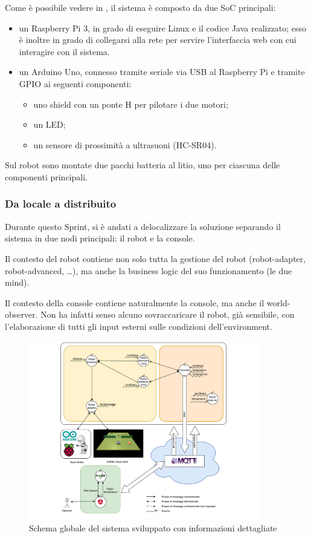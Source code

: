 Come è possibile vedere in , il sistema è composto da due SoC principali:

\begin{itemize}
  \item
    un Raspberry Pi 3, in grado di eseguire Linux e il codice Java realizzato;
    esso è inoltre in grado di collegarsi alla rete per servire l'interfaccia web con cui interagire con il sistema.
  \item
    un Arduino Uno, connesso tramite seriale via USB al Raspberry Pi e tramite GPIO ai seguenti componenti:
    \begin{itemize}
      \item uno shield con un ponte H per pilotare i due motori;
      \item un LED\@;
      \item un sensore di prossimità a ultrasuoni (HC-SR04).
    \end{itemize}
\end{itemize}

Sul robot sono montate due pacchi batteria al litio, uno per ciascuna delle componenti principali.

\subsubsection{Da locale a distribuito}

Durante questo Sprint, si è andati a delocalizzare la soluzione separando il sistema in due nodi principali:
il robot e la console.

Il contesto del robot contiene non solo tutta la gestione del robot (robot-adapter, robot-advanced, \ldots), ma anche la business logic del suo funzionamento (le due mind).

Il contesto della console contiene naturalmente la console, ma anche il world-observer.
Non ha infatti senso alcuno sovraccaricare il robot, già sensibile, con l'elaborazione di tutti gli input esterni sulle condizioni dell'environment.

\begin{figure}[H]
  \centering
  \includegraphics[width=0.9\textwidth]{res/system.pdf}%
  \caption{Schema globale del sistema sviluppato con informazioni dettagliate}%
  \label{fig:sp4:system}
\end{figure}


